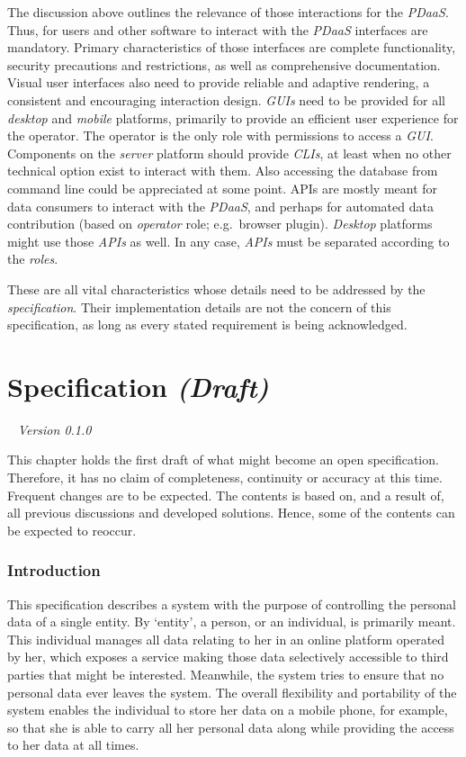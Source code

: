 \documentclass[12pt,english,a4paper,titlepage,cleardoublepage=empty,dottedtoc]{report}
\begin{document}
The discussion above outlines the relevance of those interactions for
the \emph{PDaaS}. Thus, for users and other software to interact with
the \emph{PDaaS} interfaces are mandatory. Primary characteristics of
those interfaces are complete functionality, security precautions and
restrictions, as well as comprehensive documentation. Visual user
interfaces also need to provide reliable and adaptive rendering, a
consistent and encouraging interaction design. \emph{GUIs} need to be
provided for all \emph{desktop} and \emph{mobile} platforms, primarily
to provide an efficient user experience for the operator. The operator
is the only role with permissions to access a \emph{GUI}. Components on
the \emph{server} platform should provide \emph{CLIs}, at least when no
other technical option exist to interact with them. Also accessing the
database from command line could be appreciated at some point. APIs are
mostly meant for data consumers to interact with the \emph{PDaaS}, and
perhaps for automated data contribution (based on \emph{operator} role;
e.g.~browser plugin). \emph{Desktop} platforms might use those
\emph{APIs} as well. In any case, \emph{APIs} must be separated
according to the \emph{roles}.

These are all vital characteristics whose details need to be addressed
by the \emph{specification}. Their implementation details are not the
concern of this specification, as long as every stated requirement is
being acknowledged.

\chapter{\texorpdfstring{Specification
\emph{(Draft)}}{Specification (Draft)}}\label{specification-draft}

\hfill~ \emph{Version 0.1.0}

This chapter holds the first draft of what might become an open
specification. Therefore, it has no claim of completeness, continuity or
accuracy at this time. Frequent changes are to be expected. The contents
is based on, and a result of, all previous discussions and developed
solutions. Hence, some of the contents can be expected to reoccur.

\subsection*{Introduction}\label{introduction-1}

This specification describes a system with the purpose of controlling
the personal data of a single entity. By `entity', a person, or an
individual, is primarily meant. This individual manages all data
relating to her in an online platform operated by her, which exposes a
service making those data selectively accessible to third parties that
might be interested. Meanwhile, the system tries to ensure that no
personal data ever leaves the system. The overall flexibility and
portability of the system enables the individual to store her data on a
mobile phone, for example, so that she is able to carry all her personal
data along while providing the access to her data at all times.
\end{document}
